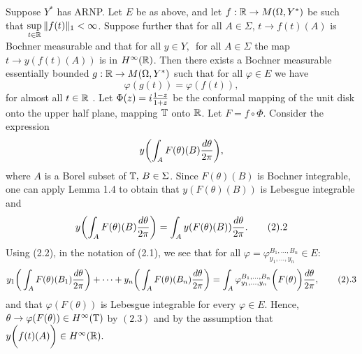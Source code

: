  Suppose $Y^*$ has ARNP. Let $E$ be as above,
and let
$f:\Bbb R\to M(\Omega, Y^*) $ be such that $\sup\limits_{t\in \Bbb R} \| f(t)\|_1<\infty$.
Suppose further that for all
$A\in \Sigma$, $t\to f(t)(A)$ is Bochner measurable and that for
all $y\in Y,\,$
 for all $A\in \Sigma$ the map $t\to y(f(t)(A))$ is in
$H^{\infty}(\Bbb R)$.
Then there exists a Bochner measurable essentially bounded $g:\Bbb R\to M(\Omega, Y^*) $
such that for all $\varphi \in E$ we have
$$ \varphi (g(t))=\varphi(f(t)), $$
for almost all $t\in \Bbb R$ .\endproclaim
\prf
Let $\Phi (z)=i{{1-z}\over{1+z}}$  be the conformal mapping of the
unit disk
onto the upper half plane, mapping $\Bbb T$  onto $\Bbb R$. Let $F=f\circ \Phi .$
Consider the expression
$$ y\biggl( \int_A F(\theta)(B) {d\theta\over{2\pi}}\biggr),$$
where $A$ is a Borel subset of $\Bbb T ,\, B\in \Sigma$.
Since $F(\theta)(B)$ is Bochner integrable, one can apply Lemma 1.4
to obtain
that $y(F(\theta)(B))$ is Lebesgue integrable and
$$y\biggl(\int_A F(\theta)(B) {{ d\theta}\over{2\pi}} \biggr)=
  \int_A y(F(\theta)(B) ){{ d\theta}\over{2\pi}}. \tag2.2$$
Using (2.2), in the notation of (2.1), we see that for all
$\varphi=\varphi_{y_1, \dots,y_n}^{B_1,\dots,B_n} \in E$:
$$y_1\bigg(\int_A F(\theta)(B_1) {{ d\theta}\over{2\pi}} \bigg)+\dots
+y_n\bigg(\int_A F(\theta)(B_n) {{ d\theta}\over{2\pi}} \bigg)=
\int_A \varphi_{y_1, \dots,y_n}^{B_1,\dots,B_n} \bigg(F(\theta)
\bigg){{ d\theta}\over{2\pi}} , \tag2.3$$
and that $\varphi(F(\theta))$ is
Lebesgue integrable for every $\varphi \in E$.
Hence, $\theta \to \varphi(F(\theta)) \in
H^{\infty}(\Bbb T)$ by $(2.3)$ and
 by the assumption that  $y\biggl(f(t)(A)\biggr)\in H^{\infty}(\Bbb R).$

